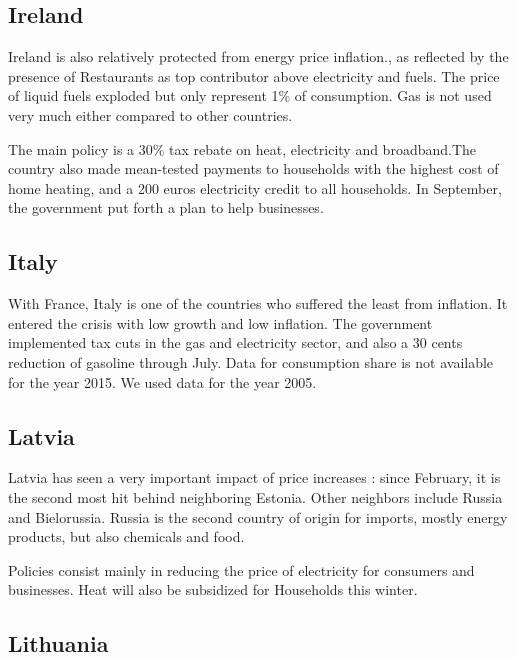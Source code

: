 \documentclass[
  9pt,
  a4paper,
  numbers=noendperiod,
  DIV=12]{scrartcl}
\begin{document}
\hypertarget{ireland}{%
\subsection{Ireland}\label{ireland}}

Ireland is also relatively protected from energy price inflation., as
reflected by the presence of Restaurants as top contributor above
electricity and fuels. The price of liquid fuels exploded but only
represent 1\% of consumption. Gas is not used very much either compared
to other countries.

The main policy is a 30\% tax rebate on heat, electricity and
broadband.The country also made mean-tested payments to households with
the highest cost of home heating, and a 200 euros electricity credit to
all households. In September, the government put forth a plan to help
businesses.

\hypertarget{italy}{%
\subsection{Italy}\label{italy}}

With France, Italy is one of the countries who suffered the least from
inflation. It entered the crisis with low growth and low inflation. The
government implemented tax cuts in the gas and electricity sector, and
also a 30 cents reduction of gasoline through July. Data for consumption
share is not available for the year 2015. We used data for the year
2005.

\hypertarget{latvia}{%
\subsection{Latvia}\label{latvia}}

Latvia has seen a very important impact of price increases : since
February, it is the second most hit behind neighboring Estonia. Other
neighbors include Russia and Bielorussia. Russia is the second country
of origin for imports, mostly energy products, but also chemicals and
food.

Policies consist mainly in reducing the price of electricity for
consumers and businesses. Heat will also be subsidized for Households
this winter.

\hypertarget{lithuania}{%
\subsection{Lithuania}\label{lithuania}}
\end{document}
